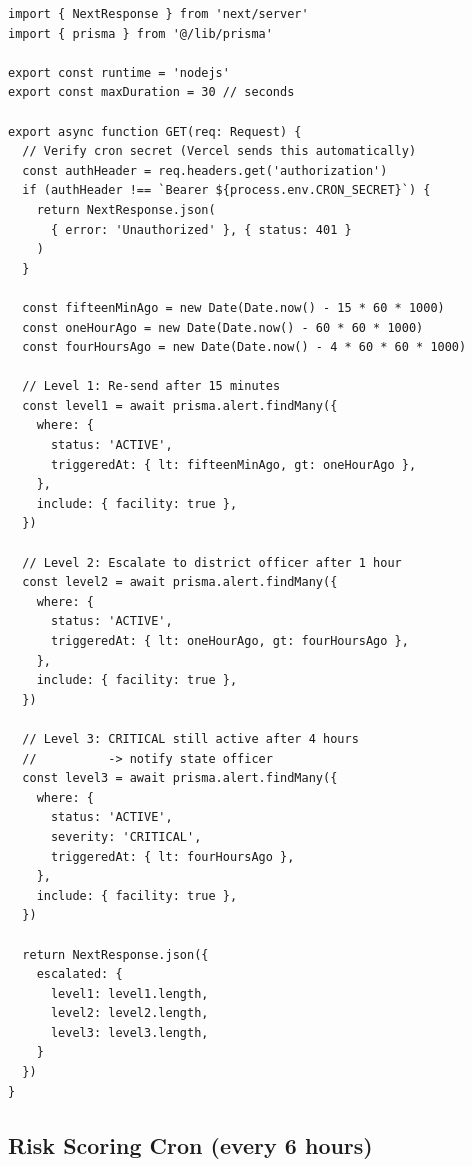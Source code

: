 \documentclass[12pt,a4paper]{report}
\begin{document}
\begin{lstlisting}[caption={app/api/cron/escalate-alerts/route.ts}]
import { NextResponse } from 'next/server'
import { prisma } from '@/lib/prisma'

export const runtime = 'nodejs'
export const maxDuration = 30 // seconds

export async function GET(req: Request) {
  // Verify cron secret (Vercel sends this automatically)
  const authHeader = req.headers.get('authorization')
  if (authHeader !== `Bearer ${process.env.CRON_SECRET}`) {
    return NextResponse.json(
      { error: 'Unauthorized' }, { status: 401 }
    )
  }

  const fifteenMinAgo = new Date(Date.now() - 15 * 60 * 1000)
  const oneHourAgo = new Date(Date.now() - 60 * 60 * 1000)
  const fourHoursAgo = new Date(Date.now() - 4 * 60 * 60 * 1000)

  // Level 1: Re-send after 15 minutes
  const level1 = await prisma.alert.findMany({
    where: {
      status: 'ACTIVE',
      triggeredAt: { lt: fifteenMinAgo, gt: oneHourAgo },
    },
    include: { facility: true },
  })

  // Level 2: Escalate to district officer after 1 hour
  const level2 = await prisma.alert.findMany({
    where: {
      status: 'ACTIVE',
      triggeredAt: { lt: oneHourAgo, gt: fourHoursAgo },
    },
    include: { facility: true },
  })

  // Level 3: CRITICAL still active after 4 hours
  //          -> notify state officer
  const level3 = await prisma.alert.findMany({
    where: {
      status: 'ACTIVE',
      severity: 'CRITICAL',
      triggeredAt: { lt: fourHoursAgo },
    },
    include: { facility: true },
  })

  return NextResponse.json({
    escalated: {
      level1: level1.length,
      level2: level2.length,
      level3: level3.length,
    }
  })
}
\end{lstlisting}

\subsection{Risk Scoring Cron (every 6 hours)}
\end{document}
